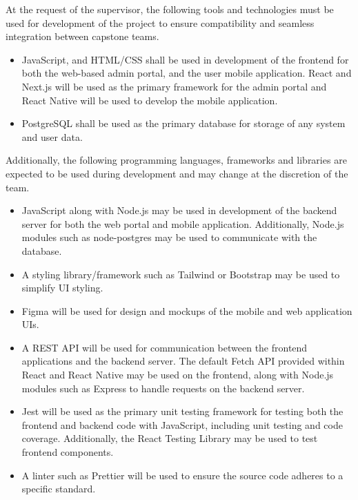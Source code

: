 \documentclass{article}
\begin{document}
\begin{flushleft}
At the request of the supervisor, the following tools and technologies must be used for development of the project to ensure compatibility and seamless integration between capstone teams.
\begin{itemize}
    \item JavaScript, and HTML/CSS shall be used in development of the frontend for both the web-based admin portal, and the user mobile application. 
    React and Next.js will be used as the primary framework for the admin portal and React Native will be used to develop the mobile application.
    \item PostgreSQL shall be used as the primary database for storage of any system and user data.
\end{itemize}

Additionally, the following programming languages, frameworks and libraries are expected to be used during development and may change at the discretion of the team.
\begin{itemize}
    \item JavaScript along with Node.js may be used in development of the backend server for both the web portal and mobile application. 
    Additionally, Node.js modules such as node-postgres may be used to communicate with the database.
    \item A styling library/framework such as Tailwind or Bootstrap may be used to simplify UI styling.
    \item Figma will be used for design and mockups of the mobile and web application UIs.
    \item A REST API will be used for communication between the frontend applications and the backend server. 
    The default Fetch API provided within React and React Native may be used on the frontend, along with Node.js modules such as Express to handle requests on the backend server.
    \item Jest will be used as the primary unit testing framework for testing both the frontend and backend code with JavaScript, including unit testing and code coverage. 
    Additionally, the React Testing Library may be used to test frontend components.
    \item A linter such as Prettier will be used to ensure the source code adheres to a specific standard.
\end{itemize}


\end{flushleft}
\end{document}
